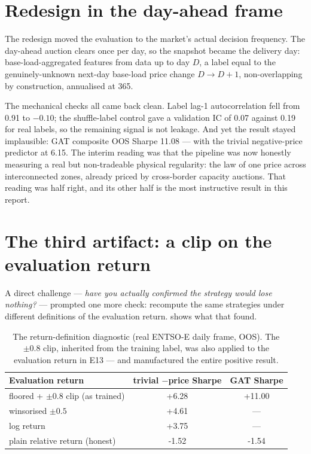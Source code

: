 \section{Redesign in the day-ahead frame}
\label{sec:en-redesign}

The redesign moved the evaluation to the market's actual decision
frequency. The day-ahead auction clears once per day, so the snapshot
became the delivery day: base-load-aggregated features from data up to
day $D$, a label equal to the genuinely-unknown next-day base-load price
change $D \to D{+}1$, non-overlapping by construction, annualised at 365.

The mechanical checks all came back clean. Label lag-1 autocorrelation
fell from 0.91 to $-0.10$; the shuffle-label control gave a validation IC
of 0.07 against 0.19 for real labels, so the remaining signal is not
leakage. And yet the result stayed implausible: GAT composite OOS Sharpe
11.08 --- with the trivial negative-price predictor at 6.15. The
interim reading was that the pipeline was now honestly measuring a real
but non-tradeable physical regularity: the law of one price across
interconnected zones, already priced by cross-border capacity auctions.
That reading was half right, and its other half is the most instructive
result in this report.

\section{The third artifact: a clip on the evaluation return}
\label{sec:en-clip}

A direct challenge --- \emph{have you actually confirmed the strategy
would lose nothing?} --- prompted one more check: recompute the same
strategies under different definitions of the evaluation return.
 shows what that found.

\begin{table}[htbp]
  \centering
  \caption{The return-definition diagnostic (real ENTSO-E daily frame,
  OOS). The $\pm0.8$ clip, inherited from the training label, was also
  applied to the evaluation return in E13 --- and manufactured the
  entire positive result.}
  \label{tab:en-clip}
  \begin{tabular}{lS[table-format=-2.2]S[table-format=-2.2]}
    \toprule
    Evaluation return & {trivial $-$price Sharpe} & {GAT Sharpe} \\
    \midrule
    floored + $\pm0.8$ clip (as trained) & +6.28 & +11.00 \\
    winsorised $\pm0.5$                  & +4.61 & {---}  \\
    log return                           & +3.75 & {---}  \\
    plain relative return (honest)       & -1.52 & -1.54  \\
    \bottomrule
  \end{tabular}
\end{table}

